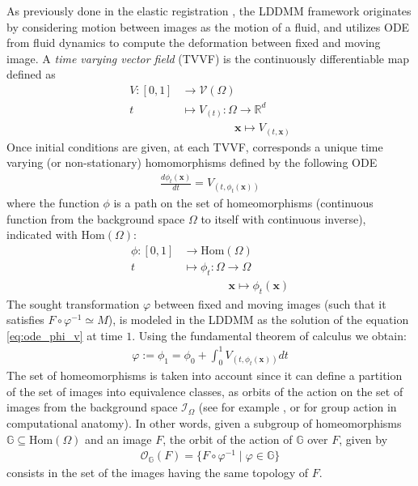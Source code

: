 As previously done in the elastic registration \cite{Broit:1981}, the LDDMM framework \cite{beg2005computing} originates by considering motion between images as the motion of a fluid, and utilizes ODE from fluid dynamics to compute the deformation between fixed and moving image. 
 A \emph{time varying vector field} (TVVF) is the continuously differentiable map defined as
 \begin{align*}
 	V:[0,1] & \longrightarrow  \mathcal{V}(\Omega)\\
 	t  &\longmapsto  V_{(t)}  : \Omega \longrightarrow   \mathbb{R}^{d} \\
 	& \qquad \quad \quad ~~~\mathbf{x} \longmapsto V_{(t,\mathbf{x} )}
 \end{align*}
 Once initial conditions are given, at each TVVF, corresponds a unique time varying (or non-stationary) homomorphisms defined  by the following ODE 
 \begin{align}\label{eq:ode_phi_v}
 	\frac{d\phi_{t} (\mathbf{x})}{dt} = V_{(t,\phi_{t} (\mathbf{x}) )}
 \end{align}
 where the function $\phi$ is a path on the set of homeomorphisms  (continuous function from the background space $\Omega$ to itself with continuous inverse), indicated with $\text{Hom}(\Omega)$:
 \begin{align*}
 	\phi : [0,1] & \longrightarrow  \text{Hom}(\Omega)\\
 	t  &\longmapsto \phi_{t}  : \Omega \longrightarrow    \Omega \\
 	& \qquad \quad \quad  \mathbf{x} \longmapsto \phi_{t}  (\mathbf{x} )
 \end{align*}
The sought transformation $\varphi$ between fixed and moving images (such that it satisfies $ F\circ \varphi^{-1} \simeq M $), is modeled in the LDDMM as the solution of the equation \ref{eq:ode_phi_v} at time $1$. Using the fundamental theorem of calculus we obtain:
 \begin{align*}
 	\varphi := \phi_{1} = \phi_{0} + \int_0^1 V_{(t,\phi_{t} (\mathbf{x}) )} dt
 \end{align*}
The set of homeomorphisms is taken into account since it can define a partition of the set of images into equivalence classes, as orbits of the action on the set of images from the background space $\mathcal{I}_{\Omega}$ (see for example \cite{artin2011algebra}, or \cite{trouve2005metamorphoses} for group action in computational anatomy). In other words, given a subgroup of homeomorphisms $\mathbb{G}\subseteq \text{Hom}(\Omega)$ and an image $F$, the orbit of the action of $\mathbb{G}$ over $F$, given by
\begin{align*}
\mathcal{O}_{\mathbb{G}}(F) = \{ F\circ \varphi^{-1} \mid \varphi \in \mathbb{G} \}
\end{align*}
consists in the set of the images having the same topology of $F$.

